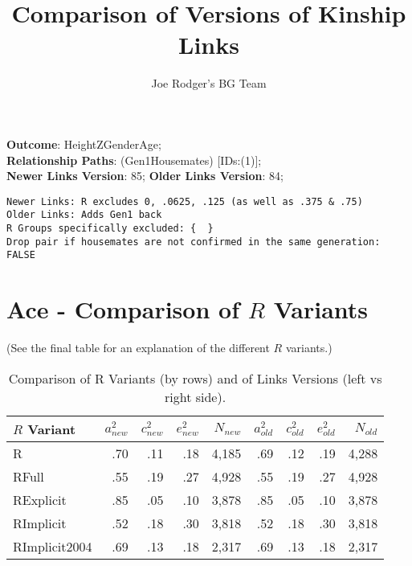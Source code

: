 \documentclass{article}\usepackage[]{graphicx}\usepackage[]{color}
\title{Comparison of Versions of Kinship Links}
\author{Joe Rodger's BG Team}
\makeatletter
\newenvironment{kframe}{%
 \def\at@end@of@kframe{}%
 \ifinner\ifhmode%
  \def\at@end@of@kframe{\end{minipage}}%
  \begin{minipage}{\columnwidth}%
 \fi\fi%
 \def\FrameCommand##1{\hskip\@totalleftmargin \hskip-\fboxsep
 \colorbox{shadecolor}{##1}\hskip-\fboxsep
     \hskip-\linewidth \hskip-\@totalleftmargin \hskip\columnwidth}%
 \MakeFramed {\advance\hsize-\width
   \@totalleftmargin\z@ \linewidth\hsize
   \@setminipage}}%
 {\par\unskip\endMakeFramed%
 \at@end@of@kframe}
\newenvironment{knitrout}{}{} %
\makeatother
\begin{document}
\maketitle
\setcounter{totalnumber}{8} %

\setlength{\parindent}{0pt}%








\textbf{Outcome}: HeightZGenderAge;\\
\textbf{Relationship Paths}: (Gen1Housemates) [IDs:(1)];\\
\textbf{Newer Links Version}: 85;
\textbf{Older Links Version}: 84;

\begin{knitrout}
\color{fgcolor}\begin{kframe}
\begin{verbatim}
Newer Links: R excludes 0, .0625, .125 (as well as .375 & .75)
Older Links: Adds Gen1 back
R Groups specifically excluded: {  }
Drop pair if housemates are not confirmed in the same generation: FALSE
\end{verbatim}
\end{kframe}
\end{knitrout}



\section{Ace - Comparison of $R$ Variants} 
(See the final table for an explanation of the different $R$ variants.)
\begin{table}[ht]
\centering
{\large
\begin{tabular}{l|rrrr|rrrr}
  \hline
$R$ Variant & $a_{new}^2$ & $c_{new}^2$ & $e_{new}^2$ & $N_{new}$ & $a_{old}^2$ & $c_{old}^2$ & $e_{old}^2$ & $N_{old}$ \\ 
  \hline
R & .70 & .11 & .18 & 4,185 & .69 & .12 & .19 & 4,288 \\ 
  RFull & .55 & .19 & .27 & 4,928 & .55 & .19 & .27 & 4,928 \\ 
  RExplicit & .85 & .05 & .10 & 3,878 & .85 & .05 & .10 & 3,878 \\ 
  RImplicit & .52 & .18 & .30 & 3,818 & .52 & .18 & .30 & 3,818 \\ 
  RImplicit2004 & .69 & .13 & .18 & 2,317 & .69 & .13 & .18 & 2,317 \\ 
   \hline
\end{tabular}
}
\caption{Comparison of R Variants (by rows) and of Links Versions (left vs right side).} 
\end{table}
\end{document}
